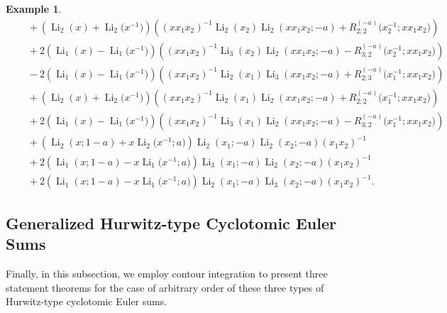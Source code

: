 \documentclass[11pt]{article}
\DeclareMathOperator{\Li}{Li}
\theoremstyle{plain}
\theoremstyle{definition}
\newtheorem{exa}[thm]{Example}
\begin{document}
\begin{exa}
\begin{align*}
	&\quad+\left(\Li_{2}(x)+\Li_{2}\Big(x^{-1}\Big)\right)\left((xx_1x_2)^{-1}\Li_{2}(x_{2})\Li_{2}(xx_1x_{2};-a)+R^{(-a)}_{2;2}\Big(x_{2}^{-1};xx_1x_2\Big)\right)\\
	&\quad+2\left(\Li_{1}(x)-\Li_{1}\Big(x^{-1}\Big)\right)
		\left((xx_1x_2)^{-1}\Li_{3}(x_{2})\Li_{2}(xx_1x_{2};-a)-R^{(-a)}_{3;2}\Big(x_{2}^{-1};xx_1x_2\Big)\right)\\
	&\quad-2\left(\Li_{1}(x)-\Li_{1}\Big(x^{-1}\Big)\right)\left((xx_1x_2)^{-1}\Li_{2}(x_{1})\Li_{3}(xx_1x_{2};-a)+R^{(-a)}_{2;3}\Big(x_{1}^{-1};xx_1x_2\Big)\right)\\
	&\quad+\left(\Li_{2}(x)+\Li_{2}\Big(x^{-1}\Big)\right)\left((xx_1x_2)^{-1}\Li_{2}(x_{1})\Li_{2}(xx_1x_{2};-a)+R^{(-a)}_{2;2}\Big(x_{1}^{-1};xx_1x_2\Big)\right)\\
	&\quad+2\left(\Li_{1}(x)-\Li_{1}\Big(x^{-1}\Big)\right)
	\left((xx_1x_2)^{-1}\Li_{3}(x_{1})\Li_{2}(xx_1x_{2};-a)-R^{(-a)}_{3;2}\Big(x_{1}^{-1};xx_1x_2\Big)\right)\\
	&\quad+\left(\Li_{2}(x;1-a)+x \Li_{2}\Big(x^{-1};a\Big) \right)\Li_{2}(x_1;-a)\Li_{2}(x_2;-a)(x_1x_2)^{-1}\\
	&\quad+2\left(\Li_{1}(x;1-a)-x \Li_{1}\Big(x^{-1};a\Big) \right)\Li_{3}(x_1;-a)\Li_{2}(x_2;-a)(x_1x_2)^{-1}\\
	&\quad+2\left(\Li_{1}(x;1-a)-x \Li_{1}\Big(x^{-1};a\Big) \right)\Li_{2}(x_1;-a)\Li_{3}(x_2;-a)(x_1x_2)^{-1}.
\end{align*}
\end{exa}

\subsection{Generalized Hurwitz-type Cyclotomic Euler Sums}
Finally, in this subsection, we employ contour integration to present three statement theorems for the case of arbitrary order of these three types of Hurwitz-type cyclotomic Euler sums.
\end{document}
